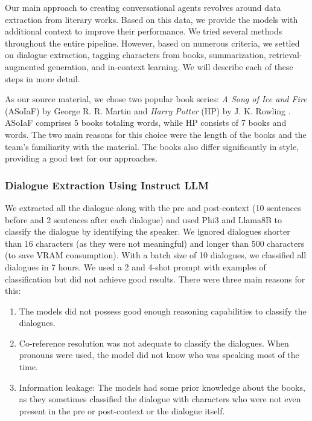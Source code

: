 \documentclass[fleqn,moreauthors,10pt]{ds_report}
\begin{document}
Our main approach to creating conversational agents revolves around data extraction from literary works. Based on this data, we provide the models with additional context to improve their performance. We tried several methods throughout the entire pipeline. However, based on numerous criteria, we settled on dialogue extraction, tagging characters from books, summarization, retrieval-augmented generation, and in-context learning. We will describe each of these steps in more detail.

As our source material, we chose two popular book series: \textit{A Song of Ice and Fire} (ASoIaF) \cite{book:asoiaf} by George R. R. Martin and \textit{Harry Potter} (HP) by J. K. Rowling \cite{book:hp}. ASoIaF comprises 5 books totaling  words, while HP consists of 7 books and  words. The two main reasons for this choice were the length of the books and the team's familiarity with the material. The books also differ significantly in style, providing a good test for our approaches.

\subsubsection*{Dialogue Extraction Using Instruct LLM}

We extracted all the dialogue along with the pre and post-context (10 sentences before and 2 sentences after each dialogue) and used Phi3 and Llama8B to classify the dialogue by identifying the speaker. We ignored dialogues shorter than 16 characters (as they were not meaningful) and longer than 500 characters (to save VRAM consumption). With a batch size of 10 dialogues, we classified all  dialogues in 7 hours. We used a 2 and 4-shot prompt with examples of classification but did not achieve good results. There were three main reasons for this:

\begin{enumerate}
	\item The models did not possess good enough reasoning capabilities to classify the dialogues.
	\item Co-reference resolution was not adequate to classify the dialogues. When pronouns were used, the model did not know who was speaking most of the time.
	\item Information leakage: The models had some prior knowledge about the books, as they sometimes classified the dialogue with characters who were not even present in the pre or post-context or the dialogue itself.
\end{enumerate}
\end{document}
